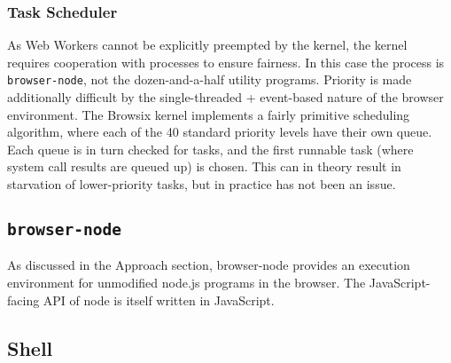 \documentclass{acm_proc_article-sp}
\begin{document}
\subsubsection{Task Scheduler}

As Web Workers cannot be explicitly preempted by the kernel, the
kernel requires cooperation with processes to ensure fairness.  In
this case the process is \texttt{browser-node}, not the
dozen-and-a-half utility programs.  Priority is made additionally
difficult by the single-threaded + event-based nature of the browser
environment.  The Browsix kernel implements a fairly primitive
scheduling algorithm, where each of the 40 standard priority levels
have their own queue.  Each queue is in turn checked for tasks, and
the first runnable task (where system call results are queued up) is
chosen.  This can in theory result in starvation of lower-priority
tasks, but in practice has not been an issue.

\subsection{\texttt{browser-node}}

As discussed in the Approach section, browser-node provides an
execution environment for unmodified node.js programs in the browser.
The JavaScript-facing API of node is itself written in JavaScript.

\subsection{Shell}
\end{document}

